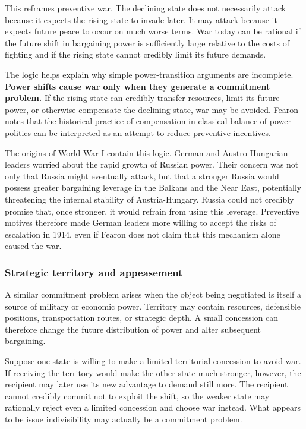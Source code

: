 This reframes preventive war. The declining state does not necessarily attack because it expects the rising state to invade later. It may attack because it expects future peace to occur on much worse terms. War today can be rational if the future shift in bargaining power is sufficiently large relative to the costs of fighting and if the rising state cannot credibly limit its future demands.

The logic helps explain why simple power-transition arguments are incomplete. \textbf{Power shifts cause war only when they generate a commitment problem.} If the rising state can credibly transfer resources, limit its future power, or otherwise compensate the declining state, war may be avoided. Fearon notes that the historical practice of compensation in classical balance-of-power politics can be interpreted as an attempt to reduce preventive incentives.

The origins of World War I contain this logic. German and Austro-Hungarian leaders worried about the rapid growth of Russian power. Their concern was not only that Russia might eventually attack, but that a stronger Russia would possess greater bargaining leverage in the Balkans and the Near East, potentially threatening the internal stability of Austria-Hungary. Russia could not credibly promise that, once stronger, it would refrain from using this leverage. Preventive motives therefore made German leaders more willing to accept the risks of escalation in 1914, even if Fearon does not claim that this mechanism alone caused the war.

\subsubsection{Strategic territory and appeasement}
A similar commitment problem arises when the object being negotiated is itself a source of military or economic power. Territory may contain resources, defensible positions, transportation routes, or strategic depth. A small concession can therefore change the future distribution of power and alter subsequent bargaining.

Suppose one state is willing to make a limited territorial concession to avoid war. If receiving the territory would make the other state much stronger, however, the recipient may later use its new advantage to demand still more. The recipient cannot credibly commit not to exploit the shift, so the weaker state may rationally reject even a limited concession and choose war instead. What appears to be issue indivisibility may actually be a commitment problem.

